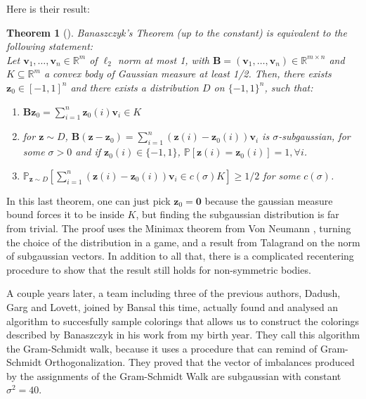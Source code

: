 \documentclass[12pt]{article}
\newtheorem{theorem}{Theorem}
\begin{document}
Here is their result:
\begin{theorem}[\cite{construct}]\label{equivalence}
Banaszczyk's Theorem (up to the constant) is equivalent to the following statement:\\
Let $\textbf{v}_1, \dots, \textbf{v}_n \in \mathbb{R}^m$ of $\ell_2$ norm at most 1, with $\textbf{B}= (\textbf{v}_1, \dots, \textbf{v}_n) \in \mathbb{R}^{m \times n}$ and $K \subseteq \mathbb{R}^m$ a convex body  of Gaussian measure at least 1/2.
Then, there exists $\textbf{z}_0 \in [-1,1]^n$ and there exists a distribution $D$ on $\{-1,1\}^n$, such that: 
\begin{enumerate}
    \item  $\textbf{B}\textbf{z}_0 = \sum_{i=1}^n \textbf{z}_0(i)\textbf{v}_i \in K$\\
    \item  for $\textbf{z} \sim D$, $\textbf{B}(\textbf{z}-\textbf{z}_0)= \sum_{i=1}^n (\textbf{z}(i)-\textbf{z}_0(i))\textbf{v}_i$ is $\sigma$-subgaussian, for some $\sigma >0$ and if $\textbf{z}_0(i) \in \{-1, 1\}$, $\mathbb{P}[\textbf{z}(i)=\textbf{z}_0(i)]=1, \forall i$.
    \item $\mathbb{P}_{\textbf{z} \sim D}[\sum_{i=1}^n (\textbf{z}(i)- \textbf{z}_0(i))\textbf{v}_i \in c(\sigma)K] \geq 1/2$ for some $c(\sigma)$.
\end{enumerate}
\end{theorem}
In this last theorem, one can just pick $\textbf{z}_0=\textbf{0}$ because the gaussian measure bound forces it to be inside $K$, but finding the subgaussian distribution is far from trivial. The proof uses the Minimax theorem from Von Neumann \cite{neumann1928theorie}, turning the choice of the distribution in a game, and a result from Talagrand \cite{talagrand2005generic} on the norm of subgaussian vectors. In addition to all that, there is a complicated recentering procedure to show that the result still holds for non-symmetric bodies.

A couple years later, a team including three of the previous authors, Dadush, Garg and Lovett, joined by Bansal this time, actually found and analysed an algorithm to succesfully sample colorings that allows us to construct the colorings described by Banaszczyk in his work from my birth year. They call this algorithm the Gram-Schmidt walk, because it uses a procedure that can remind of Gram-Schmidt Orthogonalization. They proved that the vector of imbalances produced by the assignments of the Gram-Schmidt Walk are subgaussian with constant $\sigma^2=40$.
\end{document}
